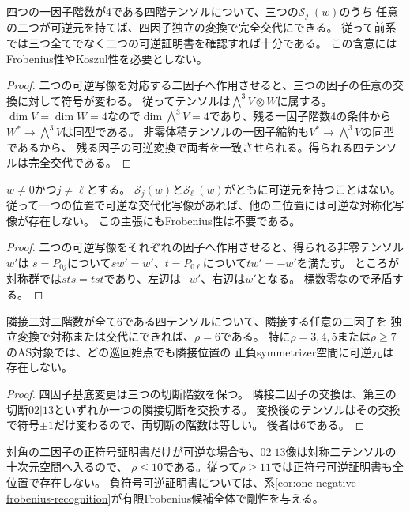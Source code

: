 \begin{corollary}[二つの交代化写像で十分]\label{cor:two-alternating-witnesses}
四つの一因子階数が4である四階テンソルについて、三つの$\mathcal S_j^-(w)$のうち
任意の二つが可逆元を持てば、四因子独立の変換で完全交代にできる。
従って前系では三つ全てでなく二つの可逆証明書を確認すれば十分である。
この含意にはFrobenius性やKoszul性を必要としない。
\end{corollary}
\begin{proof}
二つの可逆写像を対応する二因子へ作用させると、三つの因子の任意の交換に対して符号が変わる。
従ってテンソルは$\bigwedge^3 V\otimes W$に属する。
$\dim V=\dim W=4$なので$\dim\bigwedge^3 V=4$であり、残る一因子階数4の条件から
$W^*\to\bigwedge^3 V$は同型である。
非零体積テンソルの一因子縮約も$V^*\to\bigwedge^3 V$の同型であるから、
残る因子の可逆変換で両者を一致させられる。得られる四テンソルは完全交代である。
\end{proof}

\begin{corollary}
\label{cor:mixed-symmetry-witness-exclusion}
$w\ne0$かつ$j\ne\ell$とする。
$\mathcal S_j(w)$と$\mathcal S_\ell^-(w)$がともに可逆元を持つことはない。
従って一つの位置で可逆な交代化写像があれば、他の二位置には可逆な対称化写像が存在しない。
この主張にもFrobenius性は不要である。
\end{corollary}
\begin{proof}
二つの可逆写像をそれぞれの因子へ作用させると、得られる非零テンソル$w'$は
$s=P_{0j}$について$s w'=w'$、$t=P_{0\ell}$について$t w'=-w'$を満たす。
ところが対称群では$sts=tst$であり、左辺は$-w'$、右辺は$w'$となる。
標数零なので矛盾する。
\end{proof}

\begin{lemma}[隣接二因子の可逆証明書と第三階数]
\label{lem:adjacent-witness-rank-six}
隣接二対二階数が全て6である四テンソルについて、隣接する任意の二因子を
独立変換で対称または交代にできれば、$\rho=6$である。
特に$\rho=3,4,5$または$\rho\geq7$のAS対象では、どの巡回始点でも隣接位置の
正負symmetrizer空間に可逆元は存在しない。
\end{lemma}
\begin{proof}
四因子基底変更は三つの切断階数を保つ。
隣接二因子の交換は、第三の切断$02|13$といずれか一つの隣接切断を交換する。
変換後のテンソルはその交換で符号$\pm1$だけ変わるので、両切断の階数は等しい。
後者は6である。
\end{proof}

\begin{remark}
対角の二因子の正符号証明書だけが可逆な場合も、$02|13$像は対称二テンソルの十次元空間へ入るので、
$\rho\leq10$である。従って$\rho\geq11$では正符号可逆証明書も全位置で存在しない。
負符号可逆証明書については、系\ref{cor:one-negative-frobenius-recognition}が有限Frobenius候補全体で剛性を与える。
\end{remark}


